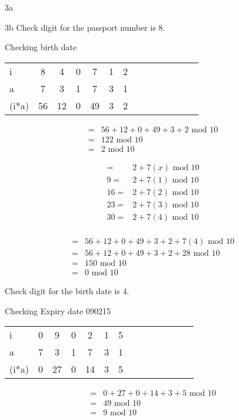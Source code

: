 \begin{question}{3a}
\begin{question}{3b}
Check digit for the passport number is 8.



Checking birth date

\begin{tabular}{l|ccccccccccccc}
\hline
i     & 8  & 4  & 0  & 7  & 1  & 2 \\
a     & 7  & 3  & 1  & 7  & 3  & 1 \\
\hline
(i*a) & 56 & 12 & 0  & 49 & 3  & 2
\end{tabular}

\begin{align*}
=& 56 + 12 + 0 + 49 + 3 + 2 \textrm{ mod } 10\\
=& 122 \textrm{ mod } 10\\
=& 2 \textrm{ mod } 10
\end{align*}

\begin{align*}
=& 2 + 7(x)\textrm{ mod } 10\\
9=& 2 + 7(1)\textrm{ mod } 10\\
16=& 2 + 7(2)\textrm{ mod } 10\\
23=& 2 + 7(3)\textrm{ mod } 10\\
30=& 2 + 7(4)\textrm{ mod } 10\\
\end{align*}

\begin{align*}
=& 56 + 12 + 0 + 49 + 3 + 2 + 7(4)\textrm{ mod } 10\\
=& 56 + 12 + 0 + 49 + 3 + 2 + 28\textrm{ mod } 10\\
=& 150 \textrm{ mod } 10\\
=& 0 \textrm{ mod } 10
\end{align*}

Check digit for the birth date is 4.



Checking Expiry date
090215

\begin{tabular}{l|ccccccccccccc}
\hline
i     & 0  & 9  & 0  & 2  & 1  & 5  \\
a     & 7  & 3  & 1  & 7  & 3  & 1  \\
\hline
(i*a) & 0  & 27 & 0  & 14 & 3  & 5
\end{tabular}

\begin{align*}
=& 0  + 27 + 0  + 14 + 3  + 5  \textrm{ mod } 10\\
=& 49 \textrm{ mod } 10\\
=& 9 \textrm{ mod } 10
\end{align*}


\end{question}
\end{question}
